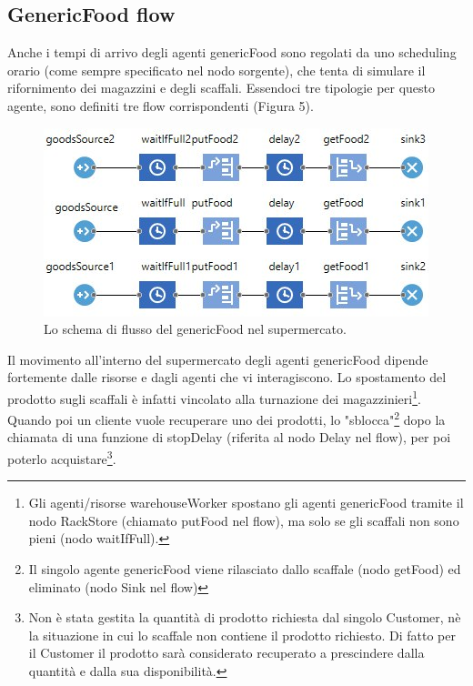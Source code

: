 \documentclass{article}
\begin{document}
\subsection{GenericFood flow}
Anche i tempi di arrivo degli agenti genericFood sono regolati da uno scheduling orario (come sempre specificato nel nodo sorgente), che tenta di simulare il rifornimento dei magazzini e degli scaffali. Essendoci tre tipologie per questo agente, sono definiti tre flow corrispondenti (Figura 5).

\begin{center}
\begin{figure}[h]
\center
\label{foodflow}
\includegraphics[scale=0.5]{./food_flow.jpeg}
\caption{\footnotesize{Lo schema di flusso del genericFood nel supermercato.}}
\end{figure}
\end{center}
Il movimento all'interno del supermercato degli agenti genericFood dipende fortemente dalle risorse e dagli agenti che vi interagiscono. Lo spostamento del prodotto sugli scaffali è infatti vincolato alla turnazione dei magazzinieri\footnote{\footnotesize{Gli agenti/risorse warehouseWorker spostano gli agenti genericFood tramite il nodo RackStore (chiamato \textsf{putFood} nel flow), ma solo se gli scaffali non sono pieni (nodo \textsf{waitIfFull}).}}. Quando poi un cliente vuole recuperare uno dei prodotti, lo "sblocca"\footnote{\footnotesize{Il singolo agente genericFood viene rilasciato dallo scaffale (nodo \textsf{getFood}) ed eliminato (nodo \textsf{Sink} nel flow)}} dopo la chiamata di una funzione di \textsf{stopDelay} (riferita al nodo \textsf{Delay} nel flow), per poi poterlo acquistare\footnote{\footnotesize{Non è stata gestita la quantità di prodotto richiesta dal singolo Customer, nè la situazione in cui lo scaffale non contiene il prodotto richiesto. Di fatto per il Customer il prodotto sarà considerato recuperato a prescindere dalla quantità e dalla sua disponibilità.}}.
\end{document}
